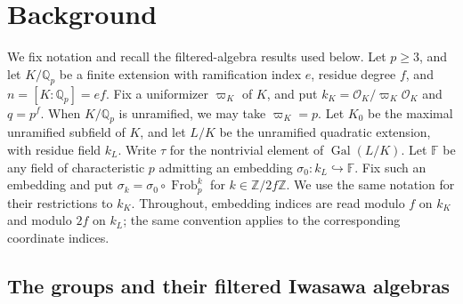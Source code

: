 \documentclass[11pt]{article}
\numberwithin{equation}{section}
\theoremstyle{definition}
\theoremstyle{remark}
\newcommand{\F}{\mathbb F}
\newcommand{\Q}{\mathbb Q}
\newcommand{\Z}{\mathbb Z}
\newcommand{\cO}{\mathcal O}
\begin{document}
\section{Background}\label{sec:background}

We fix notation and recall the filtered-algebra results used below.
Let $p\geq3$, and let $K/\Q_p$ be a finite extension with ramification
index $e$, residue degree $f$, and $n=[K:\Q_p]=ef$. Fix a uniformizer
$\varpi_K$ of $K$, and put $k_K=\cO_K/\varpi_K\cO_K$ and $q=p^f$.
When $K/\Q_p$ is unramified, we may take $\varpi_K=p$.
Let $K_0$ be the maximal unramified subfield of $K$, and let $L/K$
be the unramified quadratic extension, with residue field $k_L$.
Write $\tau$ for the nontrivial element of $\operatorname{Gal}(L/K)$.
Let $\F$ be any field of characteristic $p$ admitting an embedding
$\sigma_0:k_L\hookrightarrow\F$. Fix such an embedding
and put $\sigma_k=\sigma_0\circ\operatorname{Frob}_p^k$ for
$k\in\Z/2f\Z$. We use the same notation for their restrictions to $k_K$.
Throughout, embedding indices are read modulo $f$ on $k_K$ and
modulo $2f$ on $k_L$; the same convention applies to the corresponding
coordinate indices.

\subsection{The groups and their filtered Iwasawa algebras}
\label{subsec:groups}\label{subsec:graded-algebra}
\end{document}
